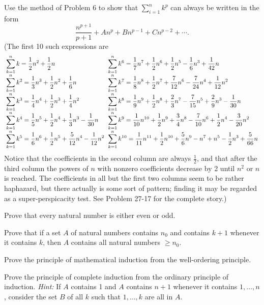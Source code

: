  Use the method of Problem 6 to show that $\sum_{i=1}^{n} k^p$ can
always be written in the form
\[ \frac{n^{p+1}}{p+1} + A n^p + B n^{p-1} + C n^{p-2} + \cdots . \]
(The first 10 such expressions are
\[
\setlength{\arraycolsep}{3pt}
\begin{array}{ll}
\displaystyle\sum_{k=1}^{n} k = \frac{1}{2}n^2 + \frac{1}{2}n
& \displaystyle\sum_{k=1}^{n} k^6 = \frac{1}{7}n^7 + \frac{1}{2}n^6
  + \frac{1}{2}n^5 - \frac{1}{6}n^3 + \frac{1}{42}n\\[1em]
\displaystyle\sum_{k=1}^{n} k^2 = \frac{1}{3}n^3 + \frac{1}{2}n^2 + \frac{1}{6}n
& \displaystyle\sum_{k=1}^{n} k^7 = \frac{1}{8}n^8 + \frac{1}{2}n^7
  + \frac{7}{12}n^6 - \frac{7}{24}n^4 + \frac{1}{12}n^2\\[1em]
\displaystyle\sum_{k=1}^{n} k^3 = \frac{1}{4}n^4 + \frac{1}{2}n^3 + \frac{1}{4}n^2
& \displaystyle\sum_{k=1}^{n} k^8 = \frac{1}{9}n^9 + \frac{1}{2}n^8
  + \frac{2}{3}n^7 - \frac{7}{15}n^5 + \frac{2}{9}n^3 - \frac{1}{30}n\\[1em]
\displaystyle\sum_{k=1}^{n} k^4 = \frac{1}{5}n^5 + \frac{1}{2}n^4 + \frac{1}{3}n^3
  - \frac{1}{30}n
& \displaystyle\sum_{k=1}^{n} k^9 = \frac{1}{10}n^{10} + \frac{1}{2}n^9
  + \frac{3}{4}n^8 - \frac{7}{10}n^6 + \frac{1}{2}n^4 - \frac{3}{20}n^2\\[1em]
\displaystyle\sum_{k=1}^{n} k^5 = \frac{1}{6}n^6 + \frac{1}{2}n^5 + \frac{5}{12}n^4
  - \frac{1}{12}n^2
& \displaystyle\sum_{k=1}^{n} k^{10} = \frac{1}{11}n^{11} + \frac{1}{2}n^{10}
  + \frac{5}{6}n^9 - n^7 + n^5 - \frac{1}{2}n^3 + \frac{5}{66}n
\end{array}
\]
Notice that the coefficients in the second column are always $\tfrac{1}{2}$,
and that after the third column the powers of $n$ with nonzero coefficients
decrease by 2 until $n^2$ or $n$ is reached. The coefficients in all but the
first two columns seem to be rather haphazard, but there actually is some
sort of pattern; finding it may be regarded as a super-perspicacity test. See
Problem 27-17 for the complete story.)

 Prove that every natural number is either even or odd.

 Prove that if a set $A$ of natural numbers contains $n_0$ and
contains $k+1$ whenever it contains $k$, then $A$ contains all natural
numbers $\geq n_0$.

 Prove the principle of mathematical induction from the well-ordering
principle.

 Prove the principle of complete induction from the ordinary
principle of induction. \textit{Hint:} If $A$ contains 1 and $A$ contains
$n+1$ whenever it contains $1, \dots, n$, consider the set $B$ of all $k$
such that $1, \dots, k$ are all in $A$.


